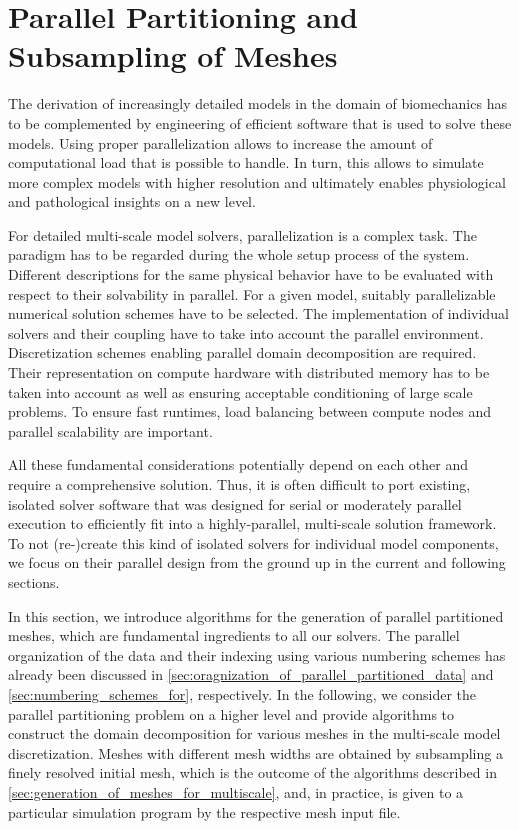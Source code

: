 \section{Parallel Partitioning and Subsampling of Meshes}\label{sec:parallel_partitioning_and_sampling_of_the}


The derivation of increasingly detailed models in the domain of biomechanics has to be complemented by engineering of efficient software that is used to solve these models. Using proper parallelization allows to increase the amount of computational load that is possible to handle. In turn, this allows to simulate more complex models with higher resolution and ultimately enables physiological and pathological insights on a new level.

For detailed multi-scale model solvers, parallelization is a complex task. 
The paradigm has to be regarded  during the whole setup process of the system. Different descriptions for the same physical behavior have to be evaluated with respect to their solvability in parallel. For a given model, suitably parallelizable numerical solution schemes have to be selected. The implementation of individual solvers and their coupling have to take into account the parallel environment. 
Discretization schemes enabling parallel domain decomposition are required. Their representation on compute hardware with distributed memory has to be taken into account as well as ensuring acceptable conditioning of large scale problems. To ensure fast runtimes, load balancing between compute nodes and parallel scalability are important.

All these fundamental considerations potentially depend on each other and require a comprehensive solution. 
Thus, it is often difficult to port existing, isolated solver software that was designed for serial or moderately parallel execution to efficiently fit into a highly-parallel, multi-scale solution framework. To not (re-)create this kind of isolated solvers for individual model components, we focus on their parallel design from the ground up in the current and following sections.

In this section, we introduce algorithms for the generation of parallel partitioned meshes, which are fundamental ingredients to all our solvers. The parallel organization of the data and their indexing using various numbering schemes
has already been discussed in \cref{sec:oragnization_of_parallel_partitioned_data} and \cref{sec:numbering_schemes_for}, respectively. 
In the following, we consider the parallel partitioning problem on a higher level and provide algorithms to construct the domain decomposition for various meshes in the multi-scale model discretization. Meshes with different mesh widths are obtained by subsampling a finely resolved initial mesh, which is the outcome of the algorithms described in \cref{sec:generation_of_meshes_for_multiscale}, and, in practice, is given to a particular simulation program by the respective mesh input file.

